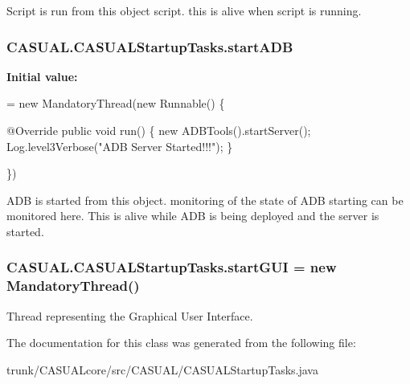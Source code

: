 Script is run from this object script. this is alive when script is running. \hypertarget{class_c_a_s_u_a_l_1_1_c_a_s_u_a_l_startup_tasks_a7cd653f1a174d1edf365da01aa97cdc5}{
\subsubsection[{start\-A\-D\-B}]{ C\-A\-S\-U\-A\-L.\-C\-A\-S\-U\-A\-L\-Startup\-Tasks.\-start\-A\-D\-B\hspace{0.3cm}{\ttfamily [static]}}}\label{class_c_a_s_u_a_l_1_1_c_a_s_u_a_l_startup_tasks_a7cd653f1a174d1edf365da01aa97cdc5}
{\bfseries Initial value\-:}
\begin{DoxyCode}
= \textcolor{keyword}{new} MandatoryThread(\textcolor{keyword}{new} Runnable() \{
            
            @Override
            \textcolor{keyword}{public} \textcolor{keywordtype}{void} run() \{
                \textcolor{keyword}{new} ADBTools().startServer();
                Log.level3Verbose(\textcolor{stringliteral}{"ADB Server Started!!!"});
            \}
        
     \})
\end{DoxyCode}
A\-D\-B is started from this object. monitoring of the state of A\-D\-B starting can be monitored here. This is alive while A\-D\-B is being deployed and the server is started. \hypertarget{class_c_a_s_u_a_l_1_1_c_a_s_u_a_l_startup_tasks_ae9b5a6af6cfbc4601ce6eedf08016819}{
\subsubsection[{start\-G\-U\-I}]{ C\-A\-S\-U\-A\-L.\-C\-A\-S\-U\-A\-L\-Startup\-Tasks.\-start\-G\-U\-I = new {\bf Mandatory\-Thread}()\hspace{0.3cm}{\ttfamily [static]}}}\label{class_c_a_s_u_a_l_1_1_c_a_s_u_a_l_startup_tasks_ae9b5a6af6cfbc4601ce6eedf08016819}
Thread representing the Graphical User Interface. 

The documentation for this class was generated from the following file\-:\begin{DoxyCompactItemize}
\item 
trunk/\-C\-A\-S\-U\-A\-Lcore/src/\-C\-A\-S\-U\-A\-L/C\-A\-S\-U\-A\-L\-Startup\-Tasks.\-java\end{DoxyCompactItemize}
